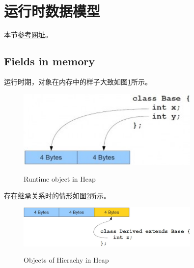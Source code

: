 ﻿\section[Rumtime object in memory]{运行时数据模型}
本节\href{http://www.programcreek.com/2011/11/what-do-java-objects-look-like-in-memory/}{参考网址}。

\subsection[Fields in memory]{Fields in memory}
运行时期，对象在内存中的样子大致如图\ref{fig:base}所示。
\begin{figure}
  \centering
  \includegraphics[width=0.8\textwidth]{picturedir/base.jpg}\\
  \caption{Runtime object in Heap}\label{fig:base}
\end{figure}

存在继承关系时的情形如图\ref{fig:derived}所示。
\begin{figure}
  \centering
  \includegraphics[width=0.8\textwidth]{picturedir/derived.jpg}\\
  \caption{Objects of Hierachy in Heap}\label{fig:derived}
\end{figure}

